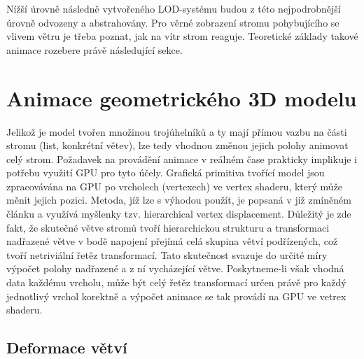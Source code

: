 Nížší úrovně následně vytvořeného LOD-systému budou z této nejpodrobnější úrovně odvozeny a abstrahovány. Pro věrné zobrazení stromu pohybujícího se vlivem větru je třeba poznat, jak na vítr strom reaguje. Teoretické základy takové animace rozebere právě následující sekce.

\section{Animace geometrického 3D modelu}
\label{sec-animation3D}

Jelikož je model tvořen množinou trojúhelníků a ty mají přímou vazbu na části stromu (list, konkrétní větev), lze tedy vhodnou změnou jejich polohy animovat celý strom. Požadavek na provádění animace v reálném čase prakticky implikuje i potřebu využití GPU pro tyto účely. Grafická primitiva tvořící model jsou zpracovávána na GPU po vrcholech (vertexech) ve vertex shaderu, který může měnit jejich pozici. 
Metoda, jíž lze s výhodou použít, je popsaná v již zmíněném článku \cite{Habel_09_PGT} a využívá myšlenky tzv. hierarchical vertex displacement. Důležitý je zde fakt, že skutečné větve stromů tvoří hierarchickou strukturu a transformaci nadřazené větve v bodě napojení přejímá celá skupina větví podřízených, což tvoří netriviální řetěz transformací. Tato skutečnost svazuje do určité míry výpočet polohy nadřazené a z ní vycházející větve. Poskytneme-li však vhodná data každému vrcholu, může být celý řetěz transformací určen právě pro každý jednotlivý vrchol korektně a výpočet animace se tak provádí na GPU ve vetrex shaderu.

\subsection{Deformace větví}
\label{sec-branchDeformation}

